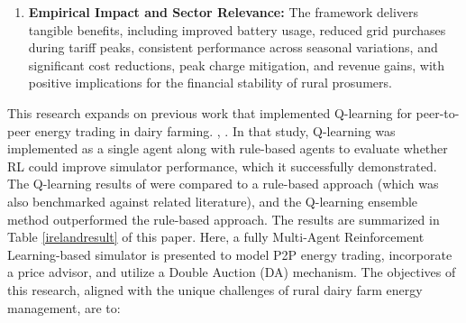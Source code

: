 \documentclass[preprint,12pt]{elsarticle}
\begin{document}
\begin{enumerate}
    \item \textbf{Empirical Impact and Sector Relevance:} The framework delivers tangible benefits, including improved battery usage, reduced grid purchases during tariff peaks, consistent performance across seasonal variations, and significant cost reductions, peak charge mitigation, and revenue gains, with positive implications for the financial stability of rural prosumers.
\end{enumerate}






This research expands on previous work that implemented Q-learning for peer-to-peer energy trading in dairy farming. \cite{shah2024reinforcement}, \cite{shah2024peer}. In that study, Q-learning was implemented as a single agent along with rule-based agents to evaluate whether RL could improve simulator performance, which it successfully demonstrated. The Q-learning results of \cite{shah2024reinforcement} were compared to a rule-based approach \cite{shah2023multi} (which was also benchmarked against related literature), and the Q-learning ensemble method outperformed the rule-based approach. The results are summarized in Table \ref{irelandresult} of this paper. Here, a fully Multi-Agent Reinforcement Learning-based simulator is presented to model P2P energy trading, incorporate a price advisor, and utilize a Double Auction (DA) mechanism. The objectives of this research, aligned with the unique challenges of rural dairy farm energy management, are to:
\end{document}
